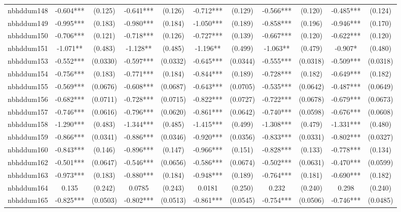 \documentclass[]{article}
\begin{document}
\begin{tabular}{lcccccccccc}
nbhddum148 & -0.604*** & (0.125) & -0.641*** & (0.126) & -0.712*** & (0.129) & -0.566*** & (0.120) & -0.485*** & (0.124) \\
nbhddum149 & -0.995*** & (0.183) & -0.980*** & (0.184) & -1.050*** & (0.189) & -0.858*** & (0.196) & -0.946*** & (0.170) \\
nbhddum150 & -0.706*** & (0.121) & -0.718*** & (0.126) & -0.727*** & (0.139) & -0.667*** & (0.120) & -0.622*** & (0.120) \\
nbhddum151 & -1.071** & (0.483) & -1.128** & (0.485) & -1.196** & (0.499) & -1.063** & (0.479) & -0.907* & (0.480) \\
nbhddum153 & -0.552*** & (0.0330) & -0.597*** & (0.0332) & -0.645*** & (0.0344) & -0.555*** & (0.0318) & -0.509*** & (0.0318) \\
nbhddum154 & -0.756*** & (0.183) & -0.771*** & (0.184) & -0.844*** & (0.189) & -0.728*** & (0.182) & -0.649*** & (0.182) \\
nbhddum155 & -0.569*** & (0.0676) & -0.608*** & (0.0687) & -0.643*** & (0.0705) & -0.535*** & (0.0642) & -0.487*** & (0.0649) \\
nbhddum156 & -0.682*** & (0.0711) & -0.728*** & (0.0715) & -0.822*** & (0.0727) & -0.722*** & (0.0678) & -0.679*** & (0.0673) \\
nbhddum157 & -0.746*** & (0.0616) & -0.796*** & (0.0620) & -0.861*** & (0.0642) & -0.740*** & (0.0598) & -0.676*** & (0.0608) \\
nbhddum158 & -1.290*** & (0.483) & -1.344*** & (0.485) & -1.415*** & (0.499) & -1.308*** & (0.479) & -1.331*** & (0.480) \\
nbhddum159 & -0.866*** & (0.0341) & -0.886*** & (0.0346) & -0.920*** & (0.0356) & -0.833*** & (0.0331) & -0.802*** & (0.0327) \\
nbhddum160 & -0.843*** & (0.146) & -0.896*** & (0.147) & -0.966*** & (0.151) & -0.828*** & (0.133) & -0.778*** & (0.134) \\
nbhddum162 & -0.501*** & (0.0647) & -0.546*** & (0.0656) & -0.586*** & (0.0674) & -0.502*** & (0.0631) & -0.470*** & (0.0599) \\
nbhddum163 & -0.973*** & (0.183) & -0.880*** & (0.184) & -0.948*** & (0.189) & -0.764*** & (0.181) & -0.690*** & (0.182) \\
nbhddum164 & 0.135 & (0.242) & 0.0785 & (0.243) & 0.0181 & (0.250) & 0.232 & (0.240) & 0.298 & (0.240) \\
nbhddum165 & -0.825*** & (0.0503) & -0.802*** & (0.0513) & -0.861*** & (0.0545) & -0.754*** & (0.0506) & -0.746*** & (0.0485) \\

\end{tabular}
\end{document}
